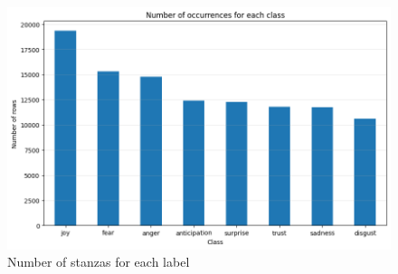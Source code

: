 

\begin{figure}[H]
    \centering
    \includegraphics[width=0.7\linewidth]{pictures/exploratory_graph.png}
    \caption{Number of stanzas for each label}
    \label{fig:enter-label}
\end{figure}

